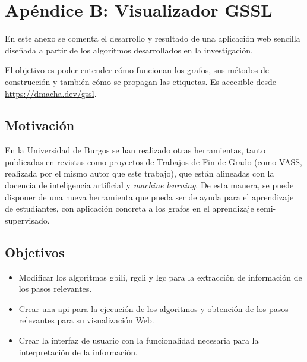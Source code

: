 




\newpage
\chapter{Apéndice B: Visualizador GSSL}
\label{apendice-b}
En este anexo se comenta el desarrollo y resultado de una aplicación web sencilla diseñada a partir de los algoritmos desarrollados en la investigación. 

El objetivo es poder entender cómo funcionan los grafos, sus métodos de construcción y también cómo se propagan las etiquetas. Es accesible desde \url{https://dmacha.dev/gssl}.

\section{Motivación}

En la Universidad de Burgos se han realizado otras herramientas, tanto publicadas en revistas como proyectos de Trabajos de Fin de Grado (como \href{https://vass.dmacha.dev}{VASS}, realizada por el mismo autor que este trabajo), que están alineadas con la docencia de inteligencia artificial y \textit{machine learning}. De esta manera, se puede disponer de una nueva herramienta que pueda ser de ayuda para el aprendizaje de estudiantes, con aplicación concreta a los grafos en el aprendizaje semi-supervisado.

\section{Objetivos}

\begin{itemize}
    \item Modificar los algoritmos \Gls{gbili}, \Gls{rgcli} y \Gls{lgc} para la extracción de información de los pasos relevantes.
    \item Crear una \Gls{api} para la ejecución de los algoritmos y obtención de los pasos relevantes para su visualización Web.
    \item Crear la interfaz de usuario con la funcionalidad necesaria para la interpretación de la información.
\end{itemize}

